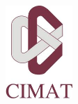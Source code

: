 \documentclass[letterpaper, titlepage,openright, oneside,11pt]{book}
\begin{document}
\thispagestyle{empty}





\begin{minipage}[c][13cm][s]{3cm}

    \begin{center}

        \includegraphics[height = 3.5cm]{logo_cimat.png} \\[13pt] %

        \hskip3pt \vrule width1pt height19cm
        \hskip1mm \vrule width2pt height19cm
        \hskip1mm \vrule width1pt height19cm \\[15pt]

    \end{center}

\end{minipage}
\end{document}
